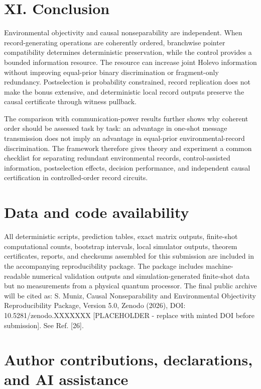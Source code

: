 \documentclass[
]{article}
\begin{document}
\section{XI. Conclusion}\label{xi.-conclusion}

Environmental objectivity and causal nonseparability are independent.
When record-generating operations are coherently ordered, branchwise
pointer compatibility determines deterministic preservation, while the
control provides a bounded information resource. The resource can
increase joint Holevo information without improving equal-prior binary
discrimination or fragment-only redundancy. Postselection is probability
constrained, record replication does not make the bonus extensive, and
deterministic local record outputs preserve the causal certificate
through witness pullback.

The comparison with communication-power results further shows why
coherent order should be assessed task by task: an advantage in one-shot
message transmission does not imply an advantage in equal-prior
environmental-record discrimination. The framework therefore gives
theory and experiment a common checklist for separating redundant
environmental records, control-assisted information, postselection
effects, decision performance, and independent causal certification in
controlled-order record circuits.

\section{Data and code availability}\label{data-and-code-availability}

All deterministic scripts, prediction tables, exact matrix outputs,
finite-shot computational counts, bootstrap intervals, local simulator
outputs, theorem certificates, reports, and checksums assembled for this
submission are included in the accompanying reproducibility package. The
package includes machine-readable numerical validation outputs and
simulation-generated finite-shot data but no measurements from a
physical quantum processor. The final public archive will be cited as:
S. Muniz, Causal Nonseparability and Environmental Objectivity
Reproducibility Package, Version 5.0, Zenodo (2026), DOI:
10.5281/zenodo.XXXXXXX {[}PLACEHOLDER - replace with minted DOI before
submission{]}. See Ref. {[}26{]}.

\section{Author contributions, declarations, and AI
assistance}\label{author-contributions-declarations-and-ai-assistance}
\end{document}
